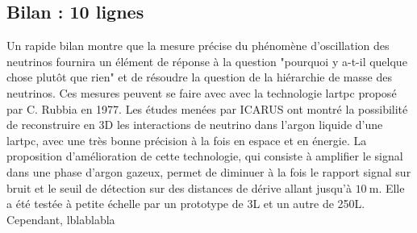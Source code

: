 \subsection{Bilan : 10 lignes}
Un rapide bilan montre que la mesure précise du phénomène d'oscillation des neutrinos fournira un élément de réponse à la question "pourquoi y a-t-il quelque chose plutôt que rien" et de résoudre la question de la hiérarchie de masse des neutrinos. Ces mesures peuvent se faire avec avec la technologie \gls{lartpc} proposé par C. Rubbia en 1977.  Les études menées par ICARUS ont montré la possibilité de reconstruire en 3D les interactions de neutrino dans l'argon liquide d'une \gls{lartpc}, avec une très bonne précision à la fois en espace et en énergie.  La proposition d'amélioration de cette technologie, qui consiste à amplifier le signal dans une phase d'argon gazeux, permet de diminuer à la fois le rapport signal sur bruit et le seuil de détection sur des distances de dérive allant jusqu'à $\SI{10}{\meter}$. Elle a été testée à petite échelle par un prototype de 3L et un autre de 250L. Cependant, lblablabla


